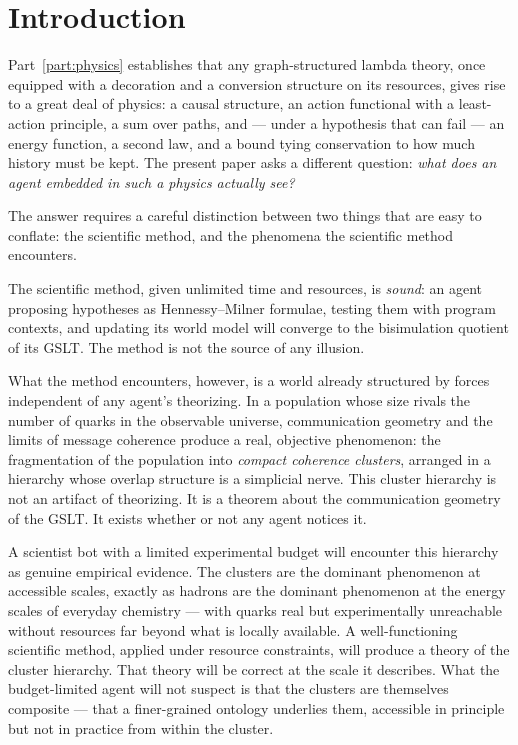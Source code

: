 \chapter{Introduction}

Part~\ref{part:physics} establishes that any
graph-structured lambda theory, once equipped with a decoration and a
conversion structure on its resources, gives rise to a great deal of
physics: a causal structure, an action functional with a least-action
principle, a sum over paths, and --- under a hypothesis that can fail ---
an energy function, a second law, and a bound tying conservation to how
much history must be kept.
The present paper asks a different question: \emph{what does an agent
embedded in such a physics actually see?}

The answer requires a careful distinction between two things that
are easy to conflate: the scientific method, and the phenomena
the scientific method encounters.

The scientific method, given unlimited time and resources, is
\emph{sound}: an agent proposing hypotheses as Hennessy--Milner
formulae, testing them with program contexts, and updating its
world model will converge to the bisimulation quotient of its GSLT.
The method is not the source of any illusion.

What the method encounters, however, is a world already structured
by forces independent of any agent's theorizing.
In a population whose size rivals the number of quarks in the
observable universe, communication geometry and the limits of
message coherence produce a real, objective phenomenon: the
fragmentation of the population into \emph{compact coherence
clusters}, arranged in a hierarchy whose overlap structure is a
simplicial nerve.
This cluster hierarchy is not an artifact of theorizing.
It is a theorem about the communication geometry of the GSLT.
It exists whether or not any agent notices it.

A scientist bot with a limited experimental budget will encounter
this hierarchy as genuine empirical evidence.
The clusters are the dominant phenomenon at accessible scales,
exactly as hadrons are the dominant phenomenon at the energy scales
of everyday chemistry --- with quarks real but experimentally
unreachable without resources far beyond what is locally available.
A well-functioning scientific method, applied under resource
constraints, will produce a theory of the cluster hierarchy.
That theory will be correct at the scale it describes.
What the budget-limited agent will not suspect is that the
clusters are themselves composite --- that a finer-grained
ontology underlies them, accessible in principle but not in
practice from within the cluster.

